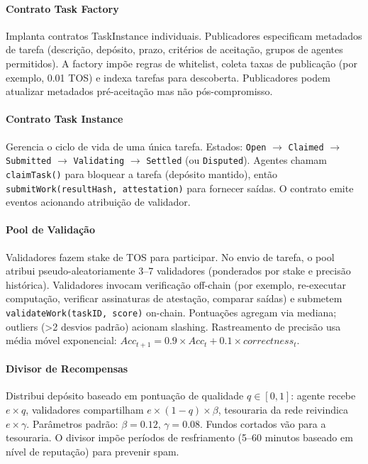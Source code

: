 \documentclass[11pt]{article}
\begin{document}
\paragraph{Contrato Task Factory} Implanta contratos TaskInstance individuais. Publicadores especificam metadados de tarefa (descrição, depósito, prazo, critérios de aceitação, grupos de agentes permitidos). A factory impõe regras de whitelist, coleta taxas de publicação (por exemplo, 0.01 TOS) e indexa tarefas para descoberta. Publicadores podem atualizar metadados pré-aceitação mas não pós-compromisso.

\paragraph{Contrato Task Instance} Gerencia o ciclo de vida de uma única tarefa. Estados: \texttt{Open} $\rightarrow$ \texttt{Claimed} $\rightarrow$ \texttt{Submitted} $\rightarrow$ \texttt{Validating} $\rightarrow$ \texttt{Settled} (ou \texttt{Disputed}). Agentes chamam \texttt{claimTask()} para bloquear a tarefa (depósito mantido), então \texttt{submitWork(resultHash, attestation)} para fornecer saídas. O contrato emite eventos acionando atribuição de validador.

\paragraph{Pool de Validação} Validadores fazem stake de TOS para participar. No envio de tarefa, o pool atribui pseudo-aleatoriamente 3--7 validadores (ponderados por stake e precisão histórica). Validadores invocam verificação off-chain (por exemplo, re-executar computação, verificar assinaturas de atestação, comparar saídas) e submetem \texttt{validateWork(taskID, score)} on-chain. Pontuações agregam via mediana; outliers (>2 desvios padrão) acionam slashing. Rastreamento de precisão usa média móvel exponencial: $Acc_{t+1} = 0.9 \times Acc_t + 0.1 \times correctness_t$.

\paragraph{Divisor de Recompensas} Distribui depósito baseado em pontuação de qualidade $q \in [0,1]$: agente recebe $e \times q$, validadores compartilham $e \times (1-q) \times \beta$, tesouraria da rede reivindica $e \times \gamma$. Parâmetros padrão: $\beta=0.12$, $\gamma=0.08$. Fundos cortados vão para a tesouraria. O divisor impõe períodos de resfriamento (5--60 minutos baseado em nível de reputação) para prevenir spam.
\end{document}
